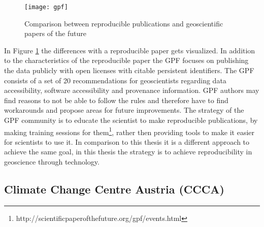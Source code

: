 \documentclass[draft,final]{vutinfth} %
\begin{document}
\begin{figure}[h]
	\centering
	\texttt{[image: gpf]}
	\caption{Comparison between reproducible publications and geoscientific papers of the future \cite{Gil2016TowardTG}}
	\label{fig:gpf} %
\end{figure}

In Figure \ref{fig:gpf} the differences with a reproducible paper gets visualized. In addition to the characteristics of the reproducible paper the GPF focuses on publishing the data publicly with open licenses with citable persistent identifiers.
The GPF consists of a set of 20 recommendations for geoscientists regarding data accessibility, software accessibility and provenance information. GPF authors may find reasons to not be able to follow the rules and therefore have to find workarounds and propose areas for future improvements. The strategy of the GPF community is to educate the scientist to make reproducible publications, by making training sessions for them\footnote{http://scientificpaperofthefuture.org/gpf/events.html}, rather then providing tools to make it easier for scientists to use it. In comparison to this thesis it is a different approach to achieve the same goal, in this thesis the strategy is to achieve reproducibility in geoscience through technology. 

\subsection{Climate Change Centre Austria (CCCA)}
\end{document}
